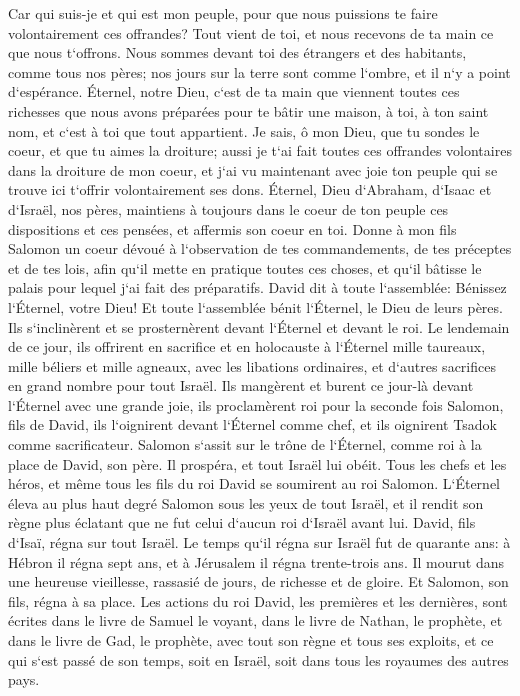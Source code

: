 \verse Car qui suis-je et qui est mon peuple, pour que nous puissions te faire volontairement ces offrandes? Tout vient de toi, et nous recevons de ta main ce que nous t`offrons. 
\verse Nous sommes devant toi des étrangers et des habitants, comme tous nos pères; nos jours sur la terre sont comme l`ombre, et il n`y a point d`espérance. 
\verse Éternel, notre Dieu, c`est de ta main que viennent toutes ces richesses que nous avons préparées pour te bâtir une maison, à toi, à ton saint nom, et c`est à toi que tout appartient. 
\verse Je sais, ô mon Dieu, que tu sondes le coeur, et que tu aimes la droiture; aussi je t`ai fait toutes ces offrandes volontaires dans la droiture de mon coeur, et j`ai vu maintenant avec joie ton peuple qui se trouve ici t`offrir volontairement ses dons. 
\verse Éternel, Dieu d`Abraham, d`Isaac et d`Israël, nos pères, maintiens à toujours dans le coeur de ton peuple ces dispositions et ces pensées, et affermis son coeur en toi. 
\verse Donne à mon fils Salomon un coeur dévoué à l`observation de tes commandements, de tes préceptes et de tes lois, afin qu`il mette en pratique toutes ces choses, et qu`il bâtisse le palais pour lequel j`ai fait des préparatifs. 
\verse David dit à toute l`assemblée: Bénissez l`Éternel, votre Dieu! Et toute l`assemblée bénit l`Éternel, le Dieu de leurs pères. Ils s`inclinèrent et se prosternèrent devant l`Éternel et devant le roi. 
\verse Le lendemain de ce jour, ils offrirent en sacrifice et en holocauste à l`Éternel mille taureaux, mille béliers et mille agneaux, avec les libations ordinaires, et d`autres sacrifices en grand nombre pour tout Israël. 
\verse Ils mangèrent et burent ce jour-là devant l`Éternel avec une grande joie, ils proclamèrent roi pour la seconde fois Salomon, fils de David, ils l`oignirent devant l`Éternel comme chef, et ils oignirent Tsadok comme sacrificateur. 
\verse Salomon s`assit sur le trône de l`Éternel, comme roi à la place de David, son père. Il prospéra, et tout Israël lui obéit. 
\verse Tous les chefs et les héros, et même tous les fils du roi David se soumirent au roi Salomon. 
\verse L`Éternel éleva au plus haut degré Salomon sous les yeux de tout Israël, et il rendit son règne plus éclatant que ne fut celui d`aucun roi d`Israël avant lui. 
\verse David, fils d`Isaï, régna sur tout Israël. 
\verse Le temps qu`il régna sur Israël fut de quarante ans: à Hébron il régna sept ans, et à Jérusalem il régna trente-trois ans. 
\verse Il mourut dans une heureuse vieillesse, rassasié de jours, de richesse et de gloire. Et Salomon, son fils, régna à sa place. 
\verse Les actions du roi David, les premières et les dernières, sont écrites dans le livre de Samuel le voyant, dans le livre de Nathan, le prophète, et dans le livre de Gad, le prophète, 
\verse avec tout son règne et tous ses exploits, et ce qui s`est passé de son temps, soit en Israël, soit dans tous les royaumes des autres pays. 
